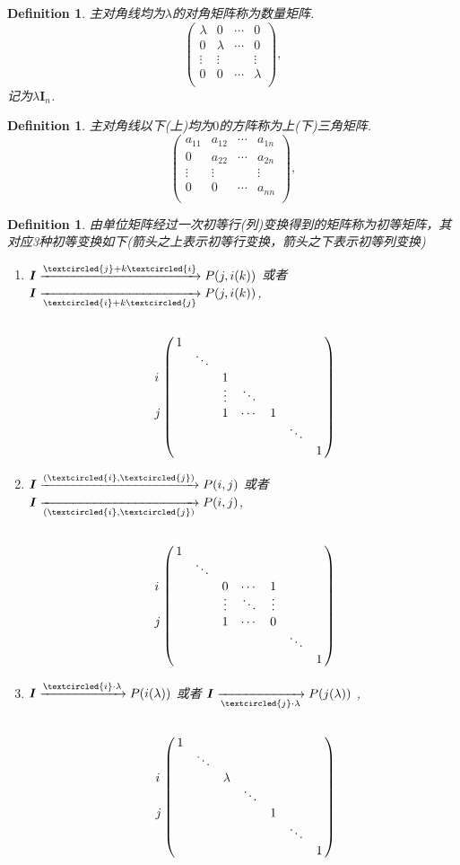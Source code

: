 \documentclass{article}
\newtheorem{definition}[theorem]{Definition}
\newcommand{\mbf}[1]{\bm{#1}}
\begin{document}
\begin{definition}
\rm 主对角线均为$\lambda$的对角矩阵称为数量矩阵.
$$
\begin{pmatrix}
\lambda & 0 & \cdots & 0 \\
0 & \lambda & \cdots & 0 \\
\vdots & \vdots & & \vdots \\
0 & 0 &\cdots & \lambda \\
\end{pmatrix},
$$
记为$\lambda \mbf{I}_{n}$.
\end{definition}

\begin{definition}
\rm  主对角线以下(上)均为$0$的方阵称为上(下)三角矩阵. 
$$
\begin{pmatrix}
a_{11} & a_{12} & \cdots & a_{1n} \\
0 & a_{22} & \cdots & a_{2n} \\
\vdots & \vdots & & \vdots \\
0 & 0 &\cdots & a_{nn} \\
\end{pmatrix},
$$
\end{definition}

\begin{definition}
\rm 由单位矩阵经过一次初等行(列)变换得到的矩阵称为初等矩阵，其对应3种初等变换如下(箭头之上表示初等行变换，箭头之下表示初等列变换)
\begin{enumerate}
	\item $\mbf{I}\xrightarrow{\tiny\textcircled{j} + k\tiny\textcircled{i}} P(j,i(k))$ 或者  $\mbf{I}\xrightarrow[\tiny\textcircled{i} + k\tiny\textcircled{j}]{} P(j,i(k))$,
	$$
		\bordermatrix{
		&\cr
		& 1 \cr
		& &\ddots	\cr
		i& & & 1 \cr
		& & & \vdots & \ddots	\cr
		j& & &  1& \cdots & 1	\cr
		& & & & & & \ddots	\cr
		& & & & & & & 1	\cr
		}
	$$
	\item $\mbf{I}\xrightarrow{(\tiny\textcircled{i},\tiny\textcircled{j})} P(i,j)$ 或者 $\mbf{I}\xrightarrow[(\tiny\textcircled{i},\tiny\textcircled{j})]{} P(i,j)$,
	$$
	\bordermatrix{
		&\cr
		& 1 \cr
		& &\ddots	\cr
		i& & & 0 & \cdots & 1\cr
		& & & \vdots & \ddots & \vdots	\cr
		j& & &  1& \cdots & 0	\cr
		& & & & & & \ddots	\cr
		& & & & & & & 1	\cr
		}
	$$
	\item $\mbf{I}\xrightarrow{\tiny\textcircled{i}\cdot \lambda} P(i(\lambda))$ 或者 $\mbf{I}\xrightarrow[\tiny\textcircled{j}\cdot \lambda]{}P(j(\lambda))$ ,
	$$
	\bordermatrix{
		&\cr
		& 1 \cr
		& &\ddots	\cr
		i& & & \lambda \cr
		& & &  & \ddots	\cr
		j& & &  &  & 1	\cr
		& & & & & & \ddots	\cr
		& & & & & & & 1	\cr
		}
	$$
\end{enumerate}
\end{definition}
\end{document}
